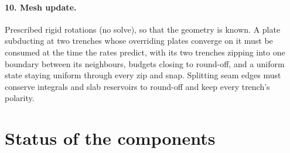 \documentclass[11pt]{article}
\begin{document}
\paragraph{10. Mesh update.} Prescribed rigid rotations (no solve), so that the geometry is known. A plate subducting at two trenches whose overriding plates converge on it must be consumed at the time the rates predict, with its two trenches zipping into one boundary between its neighbours, budgets closing to round-off, and a uniform state staying uniform through every zip and snap. Splitting seam edges must conserve integrals and slab reservoirs to round-off and keep every trench's polarity.

\section{Status of the components}
\end{document}
